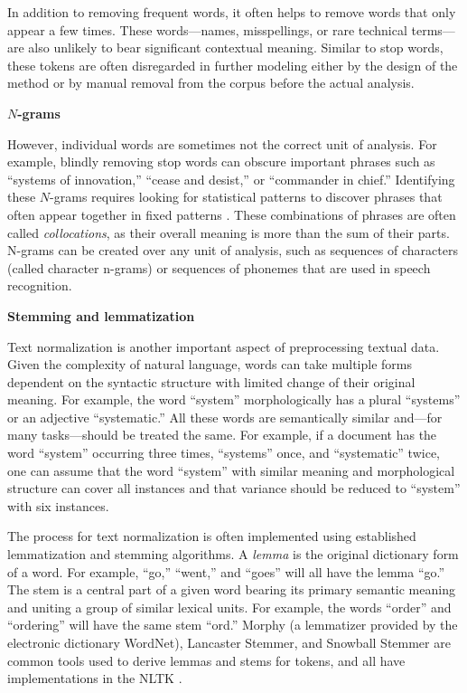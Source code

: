 \documentclass[]{krantz}
\begin{document}
In addition to removing frequent words, it often helps to remove words
that only appear a few times. These words---names, misspellings, or rare
technical terms---are also unlikely to bear significant contextual
meaning. Similar to stop words, these tokens are often disregarded in
further modeling either by the design of the method or by manual removal
from the corpus before the actual analysis.

\textbf{\(N\)-grams}

However, individual words are sometimes not the correct unit of
analysis. For example, blindly removing stop words can obscure important
phrases such as ``systems of innovation,'' ``cease and desist,'' or
``commander in chief.'' Identifying these \(N\)-grams requires looking
for statistical patterns to discover phrases that often appear together
in fixed patterns \citep{Dunning-93}. These combinations of phrases are
often called \emph{collocations}, as their overall meaning is more than
the sum of their parts. N-grams can be created over any unit of
analysis, such as sequences of characters (called character n-grams) or
sequences of phonemes that are used in speech recognition.

\textbf{Stemming and lemmatization}

Text normalization is another important aspect of preprocessing textual
data. Given the complexity of natural language, words can take multiple
forms dependent on the syntactic structure with limited change of their
original meaning. For example, the word ``system'' morphologically has a
plural ``systems'' or an adjective ``systematic.'' All these words are
semantically similar and---for many tasks---should be treated the same.
For example, if a document has the word ``system'' occurring three
times, ``systems'' once, and ``systematic'' twice, one can assume that
the word ``system'' with similar meaning and morphological structure can
cover all instances and that variance should be reduced to ``system''
with six instances.

The process for text normalization is often implemented using
established lemmatization and stemming algorithms. A \emph{lemma} is the
original dictionary form of a word. For example, ``go,'' ``went,'' and
``goes'' will all have the lemma ``go.'' The stem is a central part of a
given word bearing its primary semantic meaning and uniting a group of
similar lexical units. For example, the words ``order'' and ``ordering''
will have the same stem ``ord.'' Morphy (a lemmatizer provided by the
electronic dictionary WordNet), Lancaster Stemmer, and Snowball Stemmer
are common tools used to derive lemmas and stems for tokens, and all
have implementations in the NLTK \citep{bird-09}.
\end{document}
